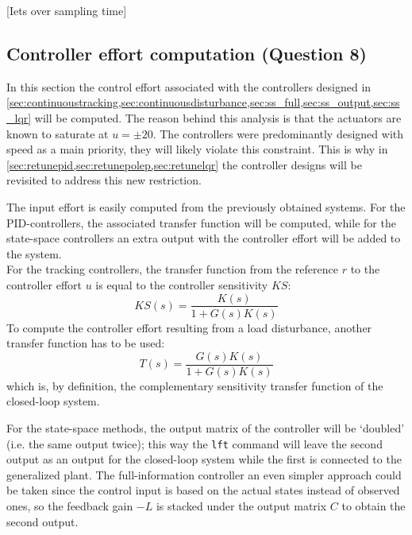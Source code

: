 [Iets over sampling time]
\subsection{Controller effort computation \textnormal{\phantom{xxx}(Question 8)}}
In this section the control effort associated with the controllers designed in \cref{sec:continuoustracking,sec:continuousdisturbance,sec:ss_full,sec:ss_output,sec:ss_lqr} will be computed. The reason behind this analysis is that the actuators are known to saturate at $u = \pm20$. The controllers were predominantly designed with speed as a main priority, they will likely violate this constraint. This is why in \cref{sec:retunepid,sec:retunepolep,sec:retunelqr} the controller designs will be revisited to address this new restriction.

The input effort is easily computed from the previously obtained systems. For the PID-controllers, the associated transfer function will be computed, while for the state-space controllers an extra output with the controller effort will be added to the system.\\
\indent For the tracking controllers, the transfer function from the reference $r$ to the controller effort $u$ is equal to the controller sensitivity $KS$:
$$ KS(s) = \frac{K(s)}{1 + G(s)K(s)} $$
To compute the controller effort resulting from a load disturbance, another transfer function has to be used:
$$ T(s) = \frac{G(s)K(s)}{1 + G(s)K(s)}$$
which is, by definition, the complementary sensitivity transfer function of the closed-loop system. 

For the state-space methods, the output matrix of the controller will be `doubled' (i.e. the same output twice); this way the \texttt{lft} command will leave the second output as an output for the closed-loop system while the first is connected to the generalized plant. The full-information controller an even simpler approach could be taken since the control input is based on the actual states instead of observed ones, so the feedback gain $-L$ is stacked under the output matrix $C$ to obtain the second output.

